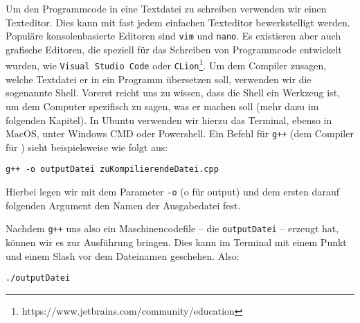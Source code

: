 Um den Programmcode in eine Textdatei zu schreiben verwenden wir einen Texteditor.
Dies kann mit fast jedem einfachen Texteditor bewerkstelligt werden. Populäre konsolenbasierte Editoren sind \texttt{vim} und \texttt{nano}. Es existieren aber auch grafische Editoren, die speziell für das Schreiben von Programmcode entwickelt wurden, wie \texttt{Visual Studio Code} oder \texttt{CLion}\footnote{https://www.jetbrains.com/community/education}.
Um dem Compiler zusagen, welche Textdatei er in ein Programm übersetzen soll, verwenden wir die sogenannte Shell. Vorerst reicht uns zu wissen, dass die Shell
ein Werkzeug ist, um dem Computer spezifisch zu sagen, was er machen soll (mehr dazu im folgenden Kapitel). In Ubuntu verwenden wir hierzu das Terminal, ebenso in MacOS,
unter Windows CMD oder Powershell. Ein Befehl für \texttt{g++} (dem Compiler für \Cpp) sieht beispielsweise wie folgt aus:

\begin{center}
    \texttt{g++ -o outputDatei zuKompilierendeDatei.cpp}
\end{center}
Hierbei legen wir mit dem Parameter \texttt{-o} (o für output) und dem ersten darauf folgenden Argument den Namen der Ausgabedatei fest.

Nachdem \texttt{g++} uns also ein Maschinencodefile -- die \texttt{outputDatei} --
erzeugt hat, können wir es zur Ausführung bringen. Dies kann im Terminal mit einem Punkt und einem Slash vor dem Dateinamen geschehen. Also:
\begin{center}
    \texttt{./outputDatei}
\end{center}



